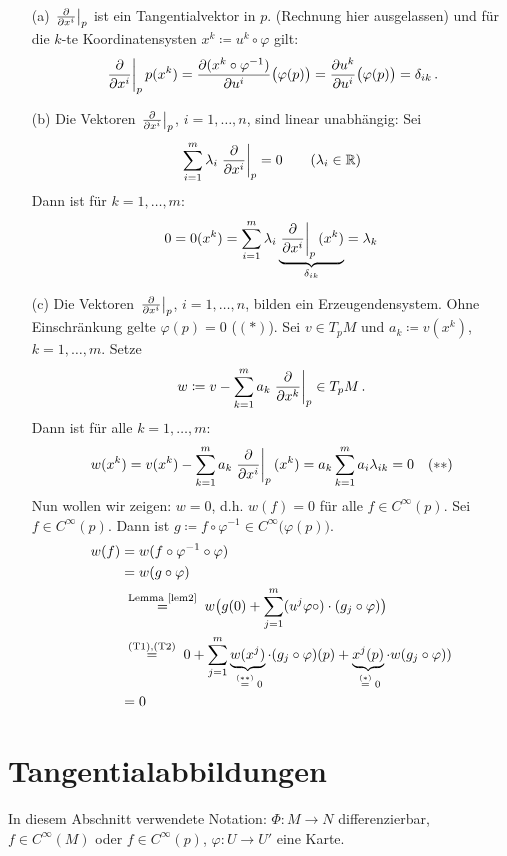 \documentclass[a4paper,twoside,DIV15,BCOR12mm]{scrbook}
\renewcommand{\da}{\coloneqq}
\begin{document}
\begin{beweis}
\begin{enumerate}
\item[(a)] $\left.\frac{\partial}{\partial x^{i}}\right|_p$ ist ein Tangentialvektor in $p$. (Rechnung hier ausgelassen) und für die $k$-te Koordinatensysten $x^k\da u^k\circ \varphi$ gilt:
\[
\left.\frac{\partial}{\partial x^{i}}\right|_pp(x^k) = \frac{\partial (x^k\circ\varphi^{-1})}{\partial u^i}\bigl(\varphi(p)\bigr) = \frac{\partial u^k}{\partial u^i}\bigl(\varphi(p)\bigr) = \delta_{ik}\,.
\]
\item[(b)] Die Vektoren $\left.\frac{\partial}{\partial x^{i}}\right|_p$, $i=1,\ldots,n$, sind linear unabhängig:
Sei 
\[
\sum_{i=1}^m \lambda_i \left.\frac{\partial}{\partial x^{i}}\right|_p = 0 
\qquad (\lambda_i\in\mathbb{R})
\]
Dann ist für $k=1,\ldots,m$:
\[
0 = 0(x^k) = 
\sum_{i=1}^m \lambda_i \underbrace{\left.\frac{\partial}{\partial x^{i}}\right|_p(x^k)}_{\delta_{ik}} = \lambda_k
\]
\item[(c)]  Die Vektoren $\left.\frac{\partial}{\partial x^{i}}\right|_p$, $i=1,\ldots,n$, bilden ein Erzeugendensystem. Ohne Einschränkung gelte $\varphi(p)=0$ ($(*)$). Sei $v\in T_pM$ und $a_k \da v(x^k)$, $k=1,\ldots,m$. Setze 
\[w\da v-\sum_{k=1}^m a_k \ptv{k} \in T_pM\,.\]
Dann ist für alle $k=1,\ldots,m$: 
\[
w(x^k) = v(x^k) - \sum_{k=1}^m  a_k \left.\frac{\partial}{\partial x^{i}}\right|_p (x^k) = a_k \sum_{k=1}^m  a_i \lambda_{ik} = 0 \quad (**)
\]
Nun wollen wir zeigen: $w=0$, d.h. $w(f) = 0$ für alle $f\in C^{\infty}(p)$.
Sei $f\in C^\infty(p)$. Dann ist $g \da f \circ \varphi^{-1} \in C^\infty\bigl(\varphi(p)\bigr)$.
\begin{align*}
w(f) &= w(f \circ \varphi^{-1} \circ \varphi) \\
&= w(g \circ \varphi) \\
&\gleichnach{Lemma \ref{lem2}} w\bigl( g(0) + \sum_{j=1}^m (u^j\varphi \circ)\cdot(g_j \circ \varphi ) \bigr) \\
& \gleichnach{(T1),(T2)} 0 + \sum_{j=1}^m \underbrace{w(x^j)}_{\gleichwegen{(**)}0} \cdot (g_j\circ\varphi)(p) + \underbrace{x^j(p)}_{\gleichwegen{(*)}0} \cdot w(g_j \circ\varphi ) ) \\
& = 0
\end{align*}
\end{enumerate}

\end{beweis}


\section{Tangentialabbildungen}

In diesem Abschnitt verwendete Notation: $\Phi: M\to N$ differenzierbar, $f\in C^\infty(M)$ oder $f\in C^\infty(p)$, $\varphi: U \to U'$ eine Karte.
\end{document}
